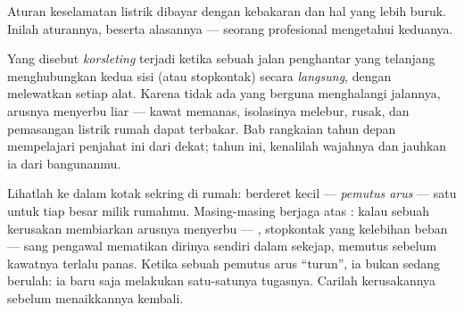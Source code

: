 Aturan keselamatan listrik dibayar dengan kebakaran dan hal yang lebih
buruk. Inilah aturannya, beserta alasannya --- seorang profesional
mengetahui keduanya.

\begin{definition}[Korsleting]\label{def:g6:circuits-and-safety:short}
Yang disebut \emph{korsleting} terjadi ketika sebuah
jalan penghantar yang telanjang menghubungkan kedua sisi  (atau
stopkontak) secara \emph{langsung}, dengan melewatkan setiap alat.
Karena tidak ada yang berguna menghalangi jalannya, arusnya menyerbu
liar --- kawat memanas, isolasinya melebur,  rusak, dan
pemasangan listrik rumah dapat terbakar. Bab rangkaian tahun depan
mempelajari penjahat ini dari dekat; tahun ini, kenalilah wajahnya dan
jauhkan ia dari bangunanmu.
\end{definition}

\begin{remark}\label{rem:g6:circuits-and-safety:guards}
Lihatlah ke dalam kotak sekring di rumah: berderet  kecil ---
\emph{pemutus arus} --- satu untuk tiap   besar
milik rumahmu. Masing-masing berjaga atas : kalau sebuah
kerusakan membiarkan arusnya menyerbu --- , stopkontak yang
kelebihan beban --- sang pengawal mematikan dirinya sendiri dalam
sekejap, memutus  sebelum kawatnya terlalu panas. Ketika
sebuah pemutus arus ``turun'', ia bukan sedang berulah: ia baru saja
melakukan satu-satunya tugasnya. Carilah kerusakannya sebelum
menaikkannya kembali.
\end{remark}

